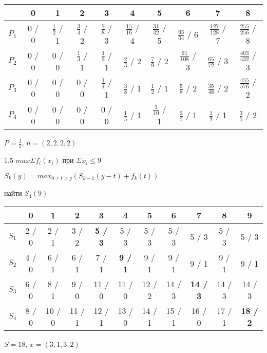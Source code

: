 \documentclass[russian]{article}
\begin{document}
\begin{tabular}{|c|c|c|c|c|c|c|c|c|c|}\hline
 & 0
 & 1
 & 2
 & 3
 & 4
 & 5
 & 6
 & 7
 & 8
\\\hline
$P_{1}$
 & 0 / 0
 & $\frac{1}{2}$ / 1
 & $\frac{3}{4}$ / 2
 & $\frac{7}{8}$ / 3
 & $\frac{15}{16}$ / 4
 & $\frac{31}{32}$ / 5
 & $\frac{63}{64}$ / 6
 & $\frac{127}{128}$ / 7
 & $\frac{255}{256}$ / 8
\\\hline
$P_{2}$
 & 0 / 0
 & 0 / 0
 & $\frac{1}{3}$ / 1
 & $\frac{1}{2}$ / 1
 & $\frac{2}{3}$ / 2
 & $\frac{7}{9}$ / 2
 & $\frac{91}{108}$ / 3
 & $\frac{65}{72}$ / 3
 & $\frac{403}{432}$ / 3
\\\hline
$P_{3}$
 & 0 / 0
 & 0 / 0
 & 0 / 0
 & $\frac{1}{4}$ / 1
 & $\frac{3}{8}$ / 1
 & $\frac{1}{2}$ / 1
 & $\frac{5}{8}$ / 2
 & $\frac{35}{48}$ / 2
 & $\frac{455}{576}$ / 2
\\\hline
$P_{4}$
 & 0 / 0
 & 0 / 0
 & 0 / 0
 & 0 / 0
 & $\frac{1}{5}$ / 1
 & $\frac{3}{10}$ / 1
 & $\frac{2}{5}$ / 1
 & $\frac{1}{2}$ / 1
 & $\frac{3}{5}$ / 2
\\\hline
\end{tabular}

$P=\frac{3}{5}$, $n=(2,2,2,2)$

1.5 $max\Sigma f_i (x_i)$ при $\Sigma x_i \le 9$

$S_k(y)=max_{0 \ge t \ge y} ( S_{k-1}(y-t) + f_k(t))$

найти $S_4(9)$

\begin{tabular}{|c|c|c|c|c|c|c|c|c|c|c|}\hline
		& 0 	& 1 	& 2 	& 3 	& 4		& 5 	& 6 	& 7 	& 8 	& 9  	\\\hline
$S_1$	& 2 / 0 & 2 / 1 & 3 / 2 & {\bf 5 / 3}	& 5 / 3 & 5 / 3 & 5 / 3 & 5 / 3 & 5 / 3 & 5 / 3 \\\hline
$S_2$	& 4 / 0 & 6 / 1 & 6 / 1 & 7 / 1 & {\bf 9 / 1 }& 9 / 1 & 9 / 1 & 9 / 1 & 9 / 1 & 9 / 1 \\\hline
$S_3$	& 6 / 0 & 8 / 1 & 9 / 0 & 11 / 0 & 11 / 0 & 12 / 2 & 14 / 3 & {\bf 14 / 3} & 14 / 3 & 14 / 3 \\\hline
$S_4$	& 8 / 0 & 10 / 0 & 11 / 1 & 12 / 1 & 13 / 0 & 14 / 1 & 15 / 1 & 16 / 0 & 17 / 1 & {\bf 18 / 2} \\\hline
\end{tabular}

$S = 18$, $x = (3, 1, 3, 2)$
\end{document}

